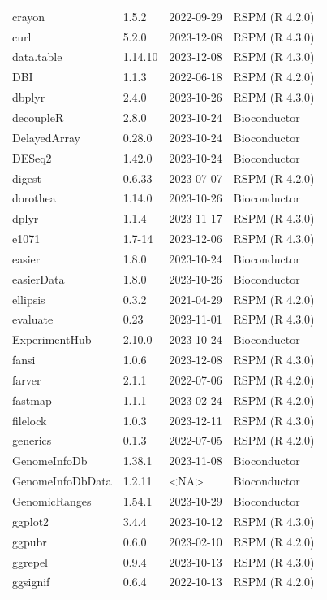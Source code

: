 \begin{longtable}[t]{llll}
crayon & 1.5.2 & 2022-09-29 & RSPM (R 4.2.0)\\
curl & 5.2.0 & 2023-12-08 & RSPM (R 4.3.0)\\
data.table & 1.14.10 & 2023-12-08 & RSPM (R 4.3.0)\\
\addlinespace
DBI & 1.1.3 & 2022-06-18 & RSPM (R 4.2.0)\\
dbplyr & 2.4.0 & 2023-10-26 & RSPM (R 4.3.0)\\
decoupleR & 2.8.0 & 2023-10-24 & Bioconductor\\
DelayedArray & 0.28.0 & 2023-10-24 & Bioconductor\\
DESeq2 & 1.42.0 & 2023-10-24 & Bioconductor\\
\addlinespace
digest & 0.6.33 & 2023-07-07 & RSPM (R 4.2.0)\\
dorothea & 1.14.0 & 2023-10-26 & Bioconductor\\
dplyr & 1.1.4 & 2023-11-17 & RSPM (R 4.3.0)\\
e1071 & 1.7-14 & 2023-12-06 & RSPM (R 4.3.0)\\
easier & 1.8.0 & 2023-10-24 & Bioconductor\\
\addlinespace
easierData & 1.8.0 & 2023-10-26 & Bioconductor\\
ellipsis & 0.3.2 & 2021-04-29 & RSPM (R 4.2.0)\\
evaluate & 0.23 & 2023-11-01 & RSPM (R 4.3.0)\\
ExperimentHub & 2.10.0 & 2023-10-24 & Bioconductor\\
fansi & 1.0.6 & 2023-12-08 & RSPM (R 4.3.0)\\
\addlinespace
farver & 2.1.1 & 2022-07-06 & RSPM (R 4.2.0)\\
fastmap & 1.1.1 & 2023-02-24 & RSPM (R 4.2.0)\\
filelock & 1.0.3 & 2023-12-11 & RSPM (R 4.3.0)\\
generics & 0.1.3 & 2022-07-05 & RSPM (R 4.2.0)\\
GenomeInfoDb & 1.38.1 & 2023-11-08 & Bioconductor\\
\addlinespace
GenomeInfoDbData & 1.2.11 & <NA> & Bioconductor\\
GenomicRanges & 1.54.1 & 2023-10-29 & Bioconductor\\
ggplot2 & 3.4.4 & 2023-10-12 & RSPM (R 4.3.0)\\
ggpubr & 0.6.0 & 2023-02-10 & RSPM (R 4.2.0)\\
ggrepel & 0.9.4 & 2023-10-13 & RSPM (R 4.3.0)\\
\addlinespace
ggsignif & 0.6.4 & 2022-10-13 & RSPM (R 4.2.0)\\

\end{longtable}
